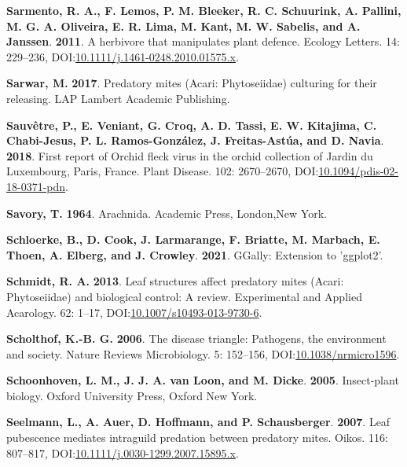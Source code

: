 \documentclass[12pt,final,CPage]{ufthesis}
\newlength{\cslhangindent}
\newenvironment{CSLReferences}[2] %
{%
	\setlength{\parindent}{0pt}
	\ifodd #1 \everypar{\setlength{\hangindent}{\cslhangindent}}\ignorespaces\fi
	\ifnum #2 > 0
	\setlength{\parskip}{#2\baselineskip}
	\fi
}%
{}
\begin{document}
{\begin{CSLReferences}{1}{0}
  \leavevmode{}%
  \textbf{Sarmento, R. A., F. Lemos, P. M. Bleeker, R. C. Schuurink, A. Pallini, M. G. A. Oliveira, E. R. Lima, M. Kant, M. W. Sabelis, and A. Janssen}. \textbf{2011}. A herbivore that manipulates plant defence. Ecology Letters. 14: 229--236, DOI:\href{https://doi.org/10.1111/j.1461-0248.2010.01575.x}{10.1111/j.1461-0248.2010.01575.x}.

  \leavevmode{}%
  \textbf{Sarwar, M.} \textbf{2017}. Predatory mites ({Acari}: {Phytoseiidae}) culturing for their releasing. LAP Lambert Academic Publishing.

  \leavevmode{}%
  \textbf{Sauvêtre, P., E. Veniant, G. Croq, A. D. Tassi, E. W. Kitajima, C. Chabi-Jesus, P. L. Ramos-González, J. Freitas-Astúa, and D. Navia}. \textbf{2018}. First report of {Orchid fleck virus} in the orchid collection of {Jardin du Luxembourg}, {Paris, France}. Plant Disease. 102: 2670--2670, DOI:\href{https://doi.org/10.1094/pdis-02-18-0371-pdn}{10.1094/pdis-02-18-0371-pdn}.

  \leavevmode{}%
  \textbf{Savory, T.} \textbf{1964}. Arachnida. Academic Press, London,New York.

  \leavevmode{}%
  \textbf{Schloerke, B., D. Cook, J. Larmarange, F. Briatte, M. Marbach, E. Thoen, A. Elberg, and J. Crowley}. \textbf{2021}. {GGally}: Extension to 'ggplot2'.

  \leavevmode{}%
  \textbf{Schmidt, R. A.} \textbf{2013}. Leaf structures affect predatory mites ({Acari}: {Phytoseiidae}) and biological control: A review. Experimental and Applied Acarology. 62: 1--17, DOI:\href{https://doi.org/10.1007/s10493-013-9730-6}{10.1007/s10493-013-9730-6}.

  \leavevmode{}%
  \textbf{Scholthof, K.-B. G.} \textbf{2006}. The disease triangle: Pathogens, the environment and society. Nature Reviews Microbiology. 5: 152--156, DOI:\href{https://doi.org/10.1038/nrmicro1596}{10.1038/nrmicro1596}.

  \leavevmode{}%
  \textbf{Schoonhoven, L. M., J. J. A. van Loon, and M. Dicke}. \textbf{2005}. Insect-plant biology. Oxford University Press, Oxford New York.

  \leavevmode{}%
  \textbf{Seelmann, L., A. Auer, D. Hoffmann, and P. Schausberger}. \textbf{2007}. Leaf pubescence mediates intraguild predation between predatory mites. Oikos. 116: 807--817, DOI:\href{https://doi.org/10.1111/j.0030-1299.2007.15895.x}{10.1111/j.0030-1299.2007.15895.x}.


\end{CSLReferences}}
\end{document}
